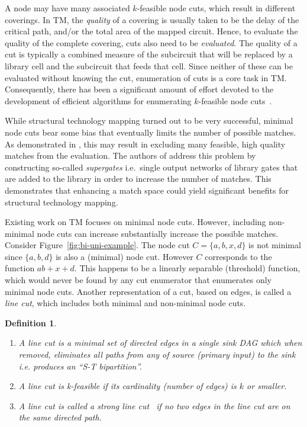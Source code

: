 \documentclass[journal]{IEEEtran}
\newtheorem{definition}{Definition}
\begin{document}
A node may have many associated $k$-feasible node cuts, which result in different coverings.  In TM, the \emph{quality} of a covering is usually  taken to be the  delay of the critical path, and/or the total area of the mapped circuit.  Hence, to evaluate the quality of the complete covering, cuts also need to be \emph{evaluated}. The quality of a cut is typically a combined measure of the subcircuit that will be replaced by a library cell and the subcircuit that feeds that cell. Since neither of these can be evaluated without knowing the cut, enumeration of cuts is a core task in TM.  Consequently, there has been a significant amount of effort devoted to the development of efficient algorithms for enumerating $k$-feasible node cuts~\cite{Chatterjee2006,Cong1994,Ling2007,Pan1998}.

While structural technology mapping turned out to be very successful, minimal node cuts bear some bias that eventually limits the number of possible matches. As demonstrated in \cite{Mishchenko_technologymapping}, this may result in excluding many feasible, high quality matches from the evaluation. The authors of \cite{Mishchenko_technologymapping} address this problem by constructing so-called \emph{supergates} i.e.\ single output networks of library gates that are added to the library in order to increase the number of matches. This demonstrates that enhancing a match space could yield significant benefits for structural technology mapping.

Existing work on TM focuses on minimal node cuts. However, including non-minimal node cuts can increase substantially increase the possible matches.  Consider Figure~\ref{fig:bi-uni-example}.  The node cut $C = \{a,b,x,d\}$ is not minimal since $\{a,b,d\}$ is also a (minimal) node cut.  However $C$ corresponds to the function $ab + x + d$.  This happens to be a linearly separable (threshold) function, which would never be found by any cut enumerator that enumerates only minimal node cuts. Another representation of a cut, based on edges, is called a \textit{line cut}, which includes both minimal and non-minimal node cuts. 

\begin{definition}
\begin{enumerate}
\item[(a)] A line cut is a \textit{minimal} set of directed edges in a single sink DAG which when removed, eliminates all paths from any of source (primary input) to the sink i.e. produces an ``S-T bipartition''.   
\item[(b)] A line cut is \textit{k-feasible} if its cardinality (number of edges) is $k$ or smaller.
\item[(c)] A line cut is called a \textit{strong} line cut~\cite{kagaris1999maximum}  if no two edges in the line cut are on the same directed path. 
\end{enumerate}
\end{definition}
\end{document}
